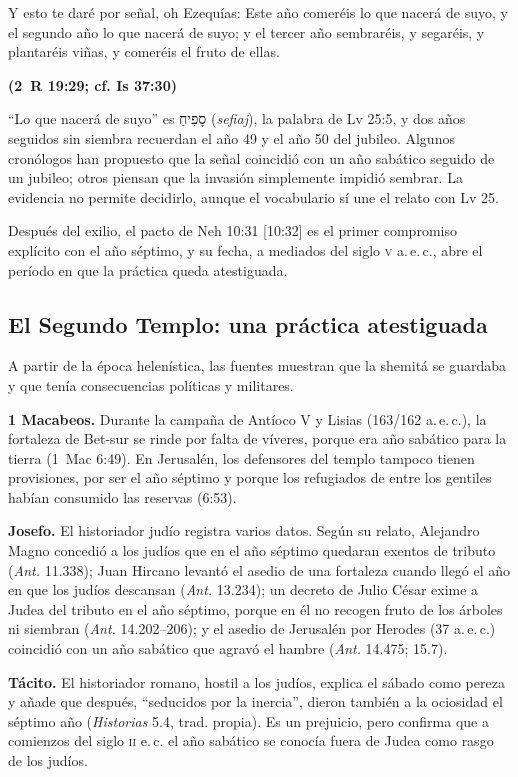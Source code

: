 \documentclass[11pt,letterpaper]{article}
\newcommand{\heb}[1]{\mbox{\foreignlanguage{hebrew}{#1}}}
\newcommand{\fuente}[1]{\par\hfill{\upshape\bfseries\small\textcolor{tierraroja}{#1}}}
\begin{document}
\begin{cita}Y esto te daré por señal, oh Ezequías: Este año comeréis lo que nacerá de suyo, y el segundo año lo que nacerá de suyo; y el tercer año sembraréis, y segaréis, y plantaréis viñas, y comeréis el fruto de ellas.\fuente{(2~R 19:29; cf. Is 37:30)}\end{cita}

``Lo que nacerá de suyo'' es \heb{סָפִיחַ} (\emph{sefiaj}), la palabra de Lv 25:5, y dos años seguidos sin siembra recuerdan el año 49 y el año 50 del jubileo. Algunos cronólogos han propuesto que la señal coincidió con un año sabático seguido de un jubileo; otros piensan que la invasión simplemente impidió sembrar. La evidencia no permite decidirlo, aunque el vocabulario sí une el relato con Lv 25.

Después del exilio, el pacto de Neh 10:31 [10:32] es el primer compromiso explícito con el año séptimo, y su fecha, a mediados del siglo \textsc{v} a.\,e.\,c., abre el período en que la práctica queda atestiguada.

\subsection{El Segundo Templo: una práctica atestiguada}
A partir de la época helenística, las fuentes muestran que la shemitá se guardaba y que tenía consecuencias políticas y militares.

\textbf{1 Macabeos.} Durante la campaña de Antíoco V y Lisias (163/162 a.\,e.\,c.), la fortaleza de Bet-sur se rinde por falta de víveres, porque era año sabático para la tierra (1~Mac 6:49). En Jerusalén, los defensores del templo tampoco tienen provisiones, por ser el año séptimo y porque los refugiados de entre los gentiles habían consumido las reservas (6:53).

\textbf{Josefo.} El historiador judío registra varios datos. Según su relato, Alejandro Magno concedió a los judíos que en el año séptimo quedaran exentos de tributo (\emph{Ant.} 11.338); Juan Hircano levantó el asedio de una fortaleza cuando llegó el año en que los judíos descansan (\emph{Ant.} 13.234); un decreto de Julio César exime a Judea del tributo en el año séptimo, porque en él no recogen fruto de los árboles ni siembran (\emph{Ant.} 14.202--206); y el asedio de Jerusalén por Herodes (37 a.\,e.\,c.) coincidió con un año sabático que agravó el hambre (\emph{Ant.} 14.475; 15.7).

\textbf{Tácito.} El historiador romano, hostil a los judíos, explica el sábado como pereza y añade que después, ``seducidos por la inercia'', dieron también a la ociosidad el séptimo año (\emph{Historias} 5.4, trad. propia). Es un prejuicio, pero confirma que a comienzos del siglo \textsc{ii} e.\,c. el año sabático se conocía fuera de Judea como rasgo de los judíos.
\end{document}
